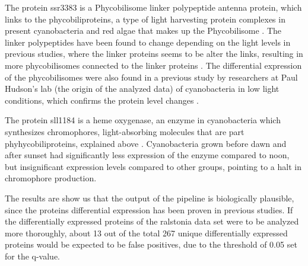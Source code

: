 The protein ssr3383 is a Phycobilisome linker polypeptide antenna protein, which links to the phycobiliproteins, a type of light harvesting protein complexes in present cyanobacteria and red algae that makes up the Phycobilisome \cite{phycobilisomes}. The linker polypeptides have been found to change depending on the light levels in previous studies, where the linker proteins seems to be alter the links, resulting in more phycobilisomes connected to the linker proteins \cite{cyano-low-light}. The differential expression of the phycobilisomes were also found in a previous study by researchers at Paul Hudson's lab (the origin of the analyzed data) of cyanobacteria in low light conditions, which confirms the protein level changes \cite{michael-jahn-cyano}.

The protein sll1184 is a heme oxygenase, an enzyme in cyanobacteria which synthesizes chromophores, light-absorbing molecules that are part phyhycobiliproteins, explained above \cite{heme-oxygenase}. Cyanobacteria grown before dawn and after sunset had significantly less expression of the enzyme compared to noon, but insignificant expression levels compared to other groups, pointing to a halt in chromophore production.

The results are show us that the output of the pipeline is biologically plausible, since the proteins differential expression has been proven in previous studies. If the differentially expressed proteins of the ralstonia data set were to be analyzed more thoroughly, about 13 out of the total 267 unique  differentially expressed proteins would be expected to be false positives, due to the threshold of 0.05 set for the q-value.
